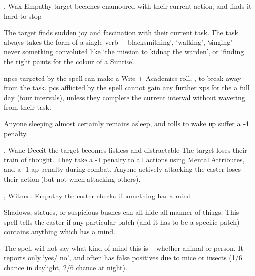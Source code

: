   {\mFate, \mWater}%
  {Wax}%
  {}%
  {Empathy}%
  {target becomes enamoured with their current action, and finds it hard to stop}%
  {
    The target finds sudden joy and fascination with their current task.
    The task always takes the form of a single verb -- `blacksmithing', `walking', `singing' -- never something convoluted like `the mission to kidnap the warden', or `finding the right paints for the colour of a Sunrise'.

    \Glspl{npc} targeted by the spell can make a Wits + Academics roll, , to break away from the task.
    \Glspl{pc} afflicted by the spell cannot gain any further \glspl{xp} for the a full day (four \glspl{interval}), unless they complete the current \gls{interval} without wavering from their task.

  Anyone sleeping almost certainly remains asleep, and rolls to wake up suffer a -4 penalty.
  }

  {\mFate, \mWater}%
  {Wane}%
  {}%
  {Deceit}%
  {the target becomes listless and distractable}%
  {
    The target loses their train of thought.
    They take a -1 penalty to all actions using Mental Attributes, and a -1 \gls{ap} penalty during combat.
    Anyone actively attacking the caster loses their action (but not when attacking others).
  }

  {\mFate, \mWater}%
  {Witness}%
  {}%
  {Empathy}%
  {the caster checks if something has a mind}%
  {
    Shadows, statues, or suspicious bushes can all hide all manner of things.
    This spell tells the caster if any particular patch (and it has to be a specific patch) contains anything which has a mind.

    The spell will not say what kind of mind this is -- whether animal or person.
    It reports only `yes/ no', and often has false positives due to mice or insects (1/6 chance in daylight, 2/6 chance at night).
  }

